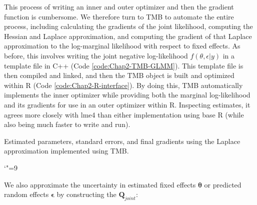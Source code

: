 This process of writing an inner and outer optimizer and then the gradient function is cumbersome.  We therefore turn to TMB to automate the entire process, including calculating the gradients of the joint likelihood, computing the Hessian and Laplace approximation, and computing the gradient of that Laplace approximation to the log-marginal likelihood with respect to fixed effects.  As before, this involves writing the joint negative log-likelihood \( f(\theta, \epsilon | y) \) in a template file in C++ (Code \ref{code:Chap2-TMB-GLMM}).  This template file is then compiled and linked, and then the TMB object is built and optimized within R (Code \ref{code:Chap2-R-interface}).  By doing this, TMB automatically implements the inner optimizer while providing both the marginal log-likelihood and its gradients for use in an outer optimizer within R. Inspecting estimates, it agrees more closely with \colorbox{backcolour}{lme4} than either implementation using base R (while also being much faster to write and run).

\lstset{style=TMBcode} 
 

\lstset{style=Rcode} 


\begin{table}
  \caption[Estimated parameters using Laplace approximation in TMB]{Estimated parameters, standard errors, and final gradients using the Laplace approximation implemented using TMB.}
  \catcode`"=9
  \centering
  \label{tab:Chap2_TMB}
\end{table}

We also approximate the uncertainty in estimated fixed effects \( \mathbf{\theta} \) or predicted random effects \( \mathbf{\epsilon} \) by constructing the  \(\mathbf{Q}_{joint}\):

